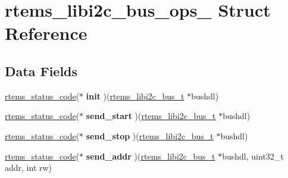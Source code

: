 \hypertarget{structrtems__libi2c__bus__ops__}{}\section{rtems\+\_\+libi2c\+\_\+bus\+\_\+ops\+\_\+ Struct Reference}
\label{structrtems__libi2c__bus__ops__}
\subsection*{Data Fields}
\begin{DoxyCompactItemize}
\item 
\mbox{\label{structrtems__libi2c__bus__ops___a144d4b8091daa92da4601863b149b6ed}} 
\mbox{\hyperlink{group__ClassicStatus_ga545d41846817eaba6143d52ee4d9e9fe}{rtems\+\_\+status\+\_\+code}}($\ast$ {\bfseries init} )(\mbox{\hyperlink{structrtems__libi2c__bus__t__}{rtems\+\_\+libi2c\+\_\+bus\+\_\+t}} $\ast$bushdl)
\item 
\mbox{\label{structrtems__libi2c__bus__ops___a3d10ac45824bcf4818d6206ca3f5b59b}} 
\mbox{\hyperlink{group__ClassicStatus_ga545d41846817eaba6143d52ee4d9e9fe}{rtems\+\_\+status\+\_\+code}}($\ast$ {\bfseries send\+\_\+start} )(\mbox{\hyperlink{structrtems__libi2c__bus__t__}{rtems\+\_\+libi2c\+\_\+bus\+\_\+t}} $\ast$bushdl)
\item 
\mbox{\label{structrtems__libi2c__bus__ops___ad1dbeb3e50f0593ba12223d15a5baf6b}} 
\mbox{\hyperlink{group__ClassicStatus_ga545d41846817eaba6143d52ee4d9e9fe}{rtems\+\_\+status\+\_\+code}}($\ast$ {\bfseries send\+\_\+stop} )(\mbox{\hyperlink{structrtems__libi2c__bus__t__}{rtems\+\_\+libi2c\+\_\+bus\+\_\+t}} $\ast$bushdl)
\item 
\mbox{\label{structrtems__libi2c__bus__ops___a7cee62c55dc27331bae0c09259039473}} 
\mbox{\hyperlink{group__ClassicStatus_ga545d41846817eaba6143d52ee4d9e9fe}{rtems\+\_\+status\+\_\+code}}($\ast$ {\bfseries send\+\_\+addr} )(\mbox{\hyperlink{structrtems__libi2c__bus__t__}{rtems\+\_\+libi2c\+\_\+bus\+\_\+t}} $\ast$bushdl, uint32\+\_\+t addr, int rw)
\item 
\mbox{\label{structrtems__libi2c__bus__ops___a1a4b1d6e21fc390eb3c67615c780dbd4}} 

\end{DoxyCompactItemize}
